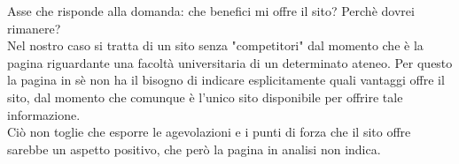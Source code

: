 Asse che risponde alla domanda: che benefici mi offre il sito? Perchè dovrei rimanere? \\
Nel nostro caso si tratta di un sito senza "competitori" dal momento che è la pagina riguardante una facoltà universitaria di un determinato ateneo. Per questo la pagina in sè non ha il bisogno di indicare esplicitamente quali vantaggi offre il sito, dal momento che comunque è l'unico sito disponibile per offrire tale informazione. \\
Ciò non toglie che esporre le agevolazioni e i punti di forza che il sito offre sarebbe un aspetto positivo, che però la pagina in analisi non indica.